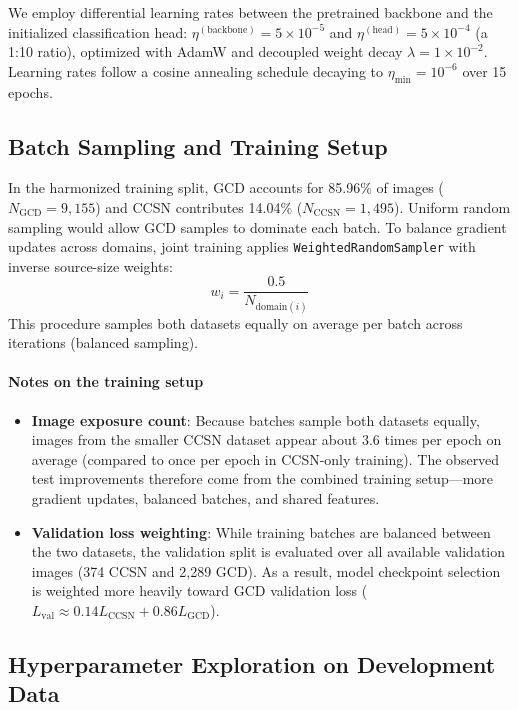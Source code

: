 \documentclass[11pt,a4paper]{article}
\begin{document}
We employ differential learning rates between the pretrained backbone and the initialized classification head: $\eta^{(\text{backbone})} = 5\times 10^{-5}$ and $\eta^{(\text{head})} = 5\times 10^{-4}$ (a 1:10 ratio), optimized with AdamW and decoupled weight decay $\lambda = 1\times 10^{-2}$. Learning rates follow a cosine annealing schedule decaying to $\eta_{\min} = 10^{-6}$ over 15 epochs.

\subsection{Batch Sampling and Training Setup}

In the harmonized training split, GCD accounts for 85.96\% of images ($N_{\text{GCD}} = 9,155$) and CCSN contributes 14.04\% ($N_{\text{CCSN}} = 1,495$). Uniform random sampling would allow GCD samples to dominate each batch. To balance gradient updates across domains, joint training applies \texttt{WeightedRandomSampler} with inverse source-size weights:
\begin{equation}
    w_i = \frac{0.5}{N_{\text{domain}(i)}}
\end{equation}
This procedure samples both datasets equally on average per batch across iterations (balanced sampling).

\paragraph{Notes on the training setup}
\begin{itemize}[noitemsep, topsep=2pt]
    \item \textbf{Image exposure count}: Because batches sample both datasets equally, images from the smaller CCSN dataset appear about 3.6 times per epoch on average (compared to once per epoch in CCSN-only training). The observed test improvements therefore come from the combined training setup---more gradient updates, balanced batches, and shared features.
    \item \textbf{Validation loss weighting}: While training batches are balanced between the two datasets, the validation split is evaluated over all available validation images (374 CCSN and 2,289 GCD). As a result, model checkpoint selection is weighted more heavily toward GCD validation loss ($L_{\text{val}} \approx 0.14 L_{\text{CCSN}} + 0.86 L_{\text{GCD}}$).
\end{itemize}

\subsection{Hyperparameter Exploration on Development Data}
\end{document}
